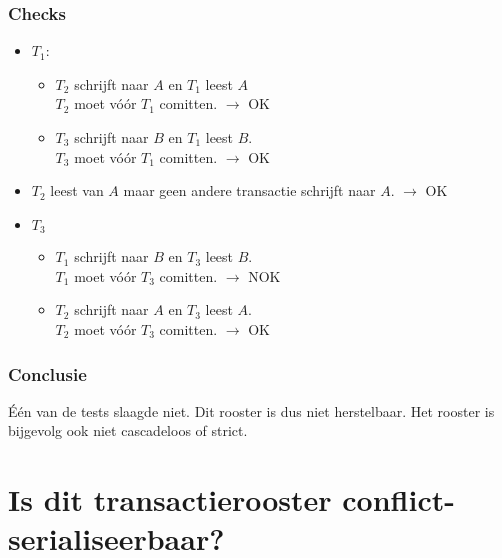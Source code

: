 \documentclass[transacties.tex]{subfiles}
\begin{document}
\subsubsection*{Checks}
\begin{itemize}
\item $T_1$:
\begin{itemize}
\item $T_2$ schrijft naar $A$ en $T_1$ leest $A$\\
$T_2$ moet v\'o\'or $T_1$ comitten. $\rightarrow$ OK
\item $T_3$ schrijft naar $B$ en $T_1$ leest $B$.\\
$T_3$ moet v\'o\'or $T_1$ comitten. $\rightarrow$ OK
\end{itemize}

\item $T_2$ leest van $A$ maar geen andere transactie schrijft naar $A$. $\rightarrow$ OK

\item $T_3$
\begin{itemize}
\item $T_1$ schrijft naar $B$ en $T_3$ leest $B$.\\
$T_1$ moet v\'o\'or $T_3$ comitten. $\rightarrow$ NOK
\item $T_2$ schrijft naar $A$ en $T_3$ leest $A$.\\
$T_2$ moet v\'o\'or $T_3$ comitten. $\rightarrow$ OK
\end{itemize}
\end{itemize}
\subsubsection*{Conclusie}
\'E\'en van de tests slaagde niet. Dit rooster is dus niet herstelbaar. Het rooster is bijgevolg ook niet cascadeloos of strict.

\section{Is dit transactierooster conflict-serialiseerbaar?}
\end{document}
